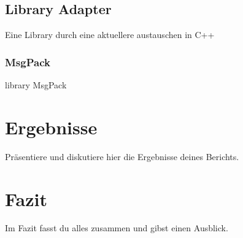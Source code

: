 \documentclass[a4paper, 12pt]{article}
\begin{document}
\subsection{Library Adapter}\label{LibraryAdapter}
Eine Library durch eine aktuellere austauschen in C++

\subsubsection{MsgPack}\label{msgpack}
library MsgPack

\newpage
\section{Ergebnisse}
Präsentiere und diskutiere hier die Ergebnisse deines Berichts.

\newpage
\section{Fazit}
Im Fazit fasst du alles zusammen und gibst einen Ausblick.

\newpage

\end{document}
